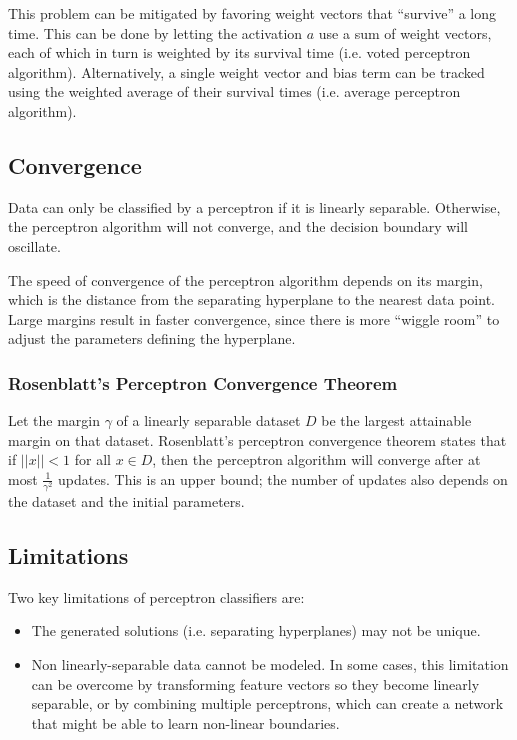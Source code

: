 \documentclass[12pt,titlepage]{article}
\begin{document}
        This problem can be mitigated by favoring weight vectors that ``survive'' a long time. This can be done by letting the activation $a$ use a sum of
        weight vectors, each of which in turn is weighted by its survival time (i.e. voted perceptron algorithm). Alternatively, a single weight vector and bias term
        can be tracked using the weighted average of their survival times (i.e. average perceptron algorithm).

    \subsection{Convergence}
      Data can only be classified by a perceptron if it is linearly separable. Otherwise, the perceptron algorithm will not converge, and the decision boundary will
      oscillate.

      The speed of convergence of the perceptron algorithm depends on its margin, which is the distance from the separating hyperplane to the nearest data point. Large
      margins result in faster convergence, since there is more ``wiggle room'' to adjust the parameters defining the hyperplane.

      \subsubsection{Rosenblatt's Perceptron Convergence Theorem}
        Let the margin $\gamma$ of a linearly separable dataset $D$ be the largest attainable margin on that dataset. Rosenblatt's perceptron convergence theorem states
        that if $||x|| < 1$ for all $x \in D$, then the perceptron algorithm will converge after at most $\frac{1}{\gamma^2}$ updates. This is an upper bound; the number
        of updates also depends on the dataset and the initial parameters.

    \subsection{Limitations}
      Two key limitations of perceptron classifiers are:
      \begin{itemize}
        \item The generated solutions (i.e. separating hyperplanes) may not be unique.
        \item Non linearly-separable data cannot be modeled. In some cases, this limitation can be overcome by transforming feature vectors so
          they become linearly separable, or by combining multiple perceptrons, which can create a network that might be able to learn non-linear boundaries.
      \end{itemize}
\end{document}
